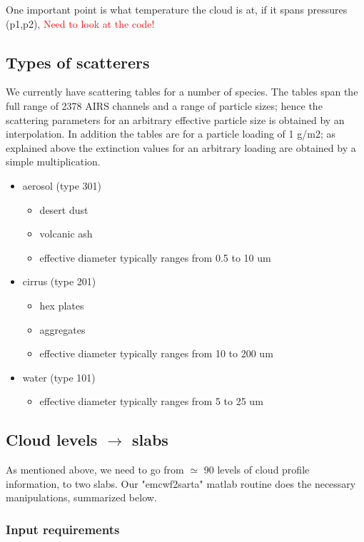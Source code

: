 \documentclass[11pt]{article}
\begin{document}
One important point is what temperature the cloud is at, if it spans pressures (p1,p2), 
\textcolor{red}{Need to look at the code!}

\subsection{Types of scatterers}
We currently have scattering tables for a number of species. The tables span the full range of 2378 AIRS channels and a 
range of particle sizes; hence the scattering parameters for an arbitrary effective particle size is obtained by an 
interpolation. In addition the tables are for a particle loading of 1 g/m2; as explained above the extinction values for 
an arbitrary loading are obtained by a simple multiplication.
\begin{itemize}
  \item aerosol (type 301)
    \begin{itemize}
      \item desert dust
      \item volcanic ash
      \item effective diameter typically ranges from 0.5 to 10 um
    \end{itemize}
  \item cirrus (type 201)
    \begin{itemize}
      \item hex plates
      \item aggregates
      \item effective diameter typically ranges from 10 to 200 um
    \end{itemize}
  \item water (type 101)
    \begin{itemize}
      \item effective diameter typically ranges from 5 to 25 um
    \end{itemize}
\end{itemize}

\subsection{Cloud levels $\rightarrow$ slabs}

As mentioned above, we need to go from $\simeq$ 90 levels of cloud profile information, to two slabs. Our 
"emcwf2sarta" matlab routine does the necessary manipulations, summarized below. 

\subsubsection{Input requirements}
\end{document}
